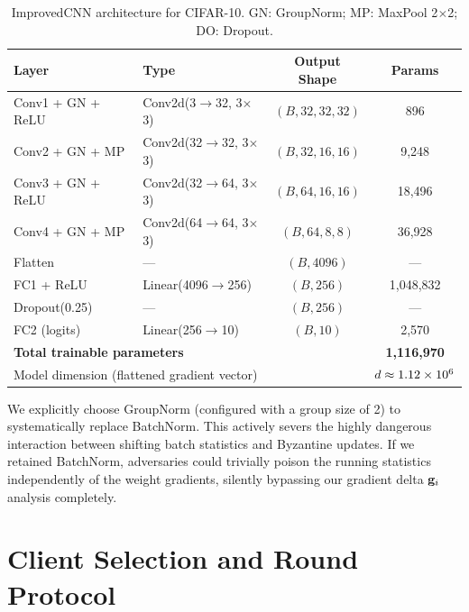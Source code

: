 \documentclass[../main.tex]{subfiles}
\begin{document}
\begin{table}[htbp]
\centering
\caption[ImprovedCNN architecture for CIFAR-10]{ImprovedCNN architecture for CIFAR-10. GN: GroupNorm; MP: MaxPool 2$\times$2; DO: Dropout.}
\label{tab:model_arch}
\begin{tabular}{llcc}
\toprule
\textbf{Layer} & \textbf{Type} & \textbf{Output Shape} & \textbf{Params} \\
\midrule
Conv1 + GN + ReLU  & Conv2d(3$\to$32, 3$\times$3)   & $(B, 32, 32, 32)$  & 896     \\
Conv2 + GN + MP    & Conv2d(32$\to$32, 3$\times$3)  & $(B, 32, 16, 16)$  & 9,248   \\
Conv3 + GN + ReLU  & Conv2d(32$\to$64, 3$\times$3)  & $(B, 64, 16, 16)$  & 18,496  \\
Conv4 + GN + MP    & Conv2d(64$\to$64, 3$\times$3)  & $(B, 64, 8, 8)$    & 36,928  \\
Flatten            & ---                             & $(B, 4096)$        & ---     \\
FC1 + ReLU         & Linear(4096$\to$256)            & $(B, 256)$         & 1,048,832 \\
Dropout(0.25)      & ---                             & $(B, 256)$         & ---     \\
FC2 (logits)       & Linear(256$\to$10)              & $(B, 10)$          & 2,570   \\
\midrule
\multicolumn{3}{l}{\textbf{Total trainable parameters}} & \textbf{1,116,970} \\
\midrule
\multicolumn{3}{l}{Model dimension (flattened gradient vector)} & $d \approx 1.12 \times 10^6$ \\
\bottomrule
\end{tabular}
\end{table}

We explicitly choose GroupNorm (configured with a group size of 2) to systematically replace BatchNorm. This actively severs the highly dangerous interaction between shifting batch statistics and Byzantine updates. If we retained BatchNorm, adversaries could trivially poison the running statistics independently of the weight gradients, silently bypassing our gradient delta $\mathbf{g}_{i}$ analysis completely.

\section{Client Selection and Round Protocol}
\label{sec:exp_round_protocol}
\end{document}
